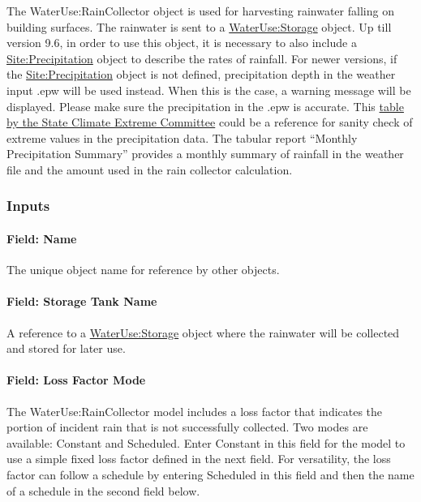 The WaterUse:RainCollector object is used for harvesting rainwater falling on building surfaces. The rainwater is sent to a \hyperref[waterusestorage]{WaterUse:Storage} object. Up till version 9.6, in order to use this object, it is necessary to also include a \hyperref[siteprecipitation]{Site:Precipitation} object to describe the rates of rainfall. For newer versions, if the \hyperref[siteprecipitation]{Site:Precipitation} object is not defined, precipitation depth in the weather input .epw will be used instead. When this is the case, a warning message will be displayed. Please make sure the precipitation in the .epw is accurate. This \href{https://www.ncdc.noaa.gov/extremes/scec/records/all/maxp}{table by the State Climate Extreme Committee} could be a reference for sanity check of extreme values in the precipitation data. The tabular report ``Monthly Precipitation Summary'' provides a monthly summary of rainfall in the weather file and the amount used in the rain collector calculation.

\subsubsection{Inputs}\label{inputs-3-041}

\paragraph{Field: Name}\label{field-name-3-037}

The unique object name for reference by other objects.

\paragraph{Field: Storage Tank Name}\label{field-storage-tank-name}

A reference to a \hyperref[waterusestorage]{WaterUse:Storage} object where the rainwater will be collected and stored for later use.

\paragraph{Field: Loss Factor Mode}\label{field-loss-factor-mode}

The WaterUse:RainCollector model includes a loss factor that indicates the portion of incident rain that is not successfully collected. Two modes are available: Constant and Scheduled. Enter Constant in this field for the model to use a simple fixed loss factor defined in the next field. For versatility, the loss factor can follow a schedule by entering Scheduled in this field and then the name of a schedule in the second field below.

